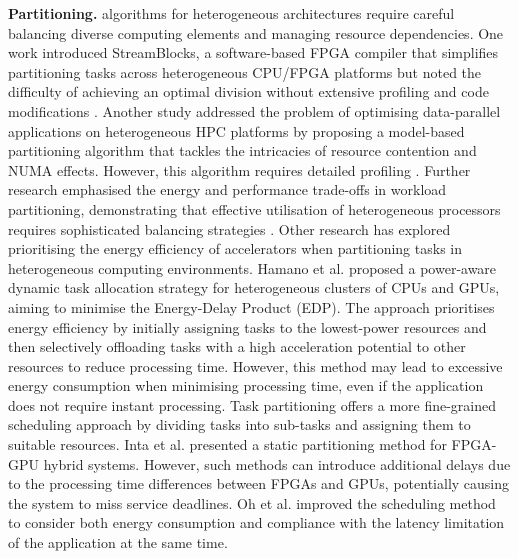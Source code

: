 \documentclass[]{spie}  %
\begin{document}
\noindent\textbf{Partitioning.} algorithms for heterogeneous architectures require careful balancing diverse computing elements and managing resource dependencies\cite{shekhar2015}. One work introduced StreamBlocks, a software-based FPGA compiler that simplifies partitioning tasks across heterogeneous CPU/FPGA platforms but noted the difficulty of achieving an optimal division without extensive profiling and code modifications \cite{emami2022}. Another study addressed the problem of optimising data-parallel applications on heterogeneous HPC platforms by proposing a model-based partitioning algorithm that tackles the intricacies of resource contention and NUMA effects. However, this algorithm requires detailed profiling \cite{khaleghzadeh2018}. Further research emphasised the energy and performance trade-offs in workload partitioning, demonstrating that effective utilisation of heterogeneous processors requires sophisticated balancing strategies \cite{tang2017}. Other research has explored prioritising the energy efficiency of accelerators when partitioning tasks in heterogeneous computing environments. Hamano et al.\cite{Hamano} proposed a power-aware dynamic task allocation strategy for heterogeneous clusters of CPUs and GPUs, aiming to minimise the Energy-Delay Product (EDP). The approach prioritises energy efficiency by initially assigning tasks to the lowest-power resources and then selectively offloading tasks with a high acceleration potential to other resources to reduce processing time. However, this method may lead to excessive energy consumption when minimising processing time, even if the application does not require instant processing. Task partitioning offers a more fine-grained scheduling approach by dividing tasks into sub-tasks and assigning them to suitable resources. Inta et al.\cite{IntBowDav12} presented a static partitioning method for FPGA-GPU hybrid systems. However, such methods can introduce additional delays due to the processing time differences between FPGAs and GPUs, potentially causing the system to miss service deadlines. Oh et al.\cite{OhHanYan18} improved the scheduling method to consider both energy consumption and compliance with the latency limitation of
the application at the same time.
\end{document}
